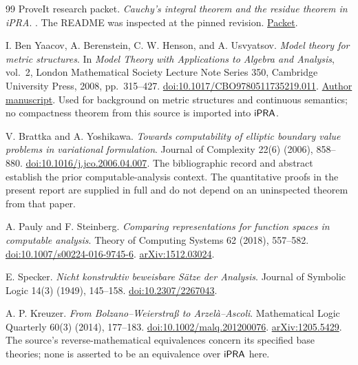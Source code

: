 \begin{thebibliography}{99}
ProveIt research packet.
\emph{Cauchy's integral theorem and the residue theorem in iPRA}.
.
The README was inspected at the pinned revision.
\href{https://github.com/VladimirReshetnikov/ProveIt/tree/5f3be02388442f16487d2dc5c2529961dd783d2b/Logic/PrimitiveRecursiveArithmetic/docs/proofs/analysis/cauchy_residue_ipra}{Packet}.

I. Ben Yaacov, A. Berenstein, C. W. Henson, and A. Usvyatsov.
\emph{Model theory for metric structures}.
In \emph{Model Theory with Applications to Algebra and Analysis},
vol.~2, London Mathematical Society Lecture Note Series 350,
Cambridge University Press, 2008, pp.~315--427.
\href{https://doi.org/10.1017/CBO9780511735219.011}{doi:10.1017/CBO9780511735219.011}.
\href{https://math.univ-lyon1.fr/~begnac/articles/mtfms.pdf}{Author manuscript}.
Used for background on metric structures and continuous semantics;
no compactness theorem from this source is imported into \(\mathsf{iPRA}\).

V. Brattka and A. Yoshikawa.
\emph{Towards computability of elliptic boundary value problems in
variational formulation}.
Journal of Complexity 22(6) (2006), 858--880.
\href{https://doi.org/10.1016/j.jco.2006.04.007}{doi:10.1016/j.jco.2006.04.007}.
The bibliographic record and abstract establish the prior computable-analysis
context. The quantitative proofs in the present report are supplied in full
and do not depend on an uninspected theorem from that paper.

A. Pauly and F. Steinberg.
\emph{Comparing representations for function spaces in computable analysis}.
Theory of Computing Systems 62 (2018), 557--582.
\href{https://doi.org/10.1007/s00224-016-9745-6}{doi:10.1007/s00224-016-9745-6}.
\href{https://arxiv.org/abs/1512.03024}{arXiv:1512.03024}.

E. Specker.
\emph{Nicht konstruktiv beweisbare S\"atze der Analysis}.
Journal of Symbolic Logic 14(3) (1949), 145--158.
\href{https://doi.org/10.2307/2267043}{doi:10.2307/2267043}.

A. P. Kreuzer.
\emph{From Bolzano--Weierstra{\ss} to Arzel\`a--Ascoli}.
Mathematical Logic Quarterly 60(3) (2014), 177--183.
\href{https://doi.org/10.1002/malq.201200076}{doi:10.1002/malq.201200076}.
\href{https://arxiv.org/abs/1205.5429}{arXiv:1205.5429}.
The source's reverse-mathematical equivalences concern its specified base
theories; none is asserted to be an equivalence over \(\mathsf{iPRA}\) here.

\end{thebibliography}
